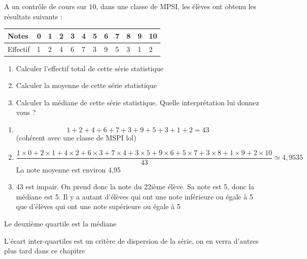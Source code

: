 \begin{exemple}
A un contrôle de cours sur $10$, dans une classe de MPSI, les élèves ont obtenu les résultats suivants :\newline

 
\begin{tabularx}{\linewidth}{|X|X|X|X|X|X|X|X|X|X|X|X|}
\hline
Notes & 0 & 1 & 2 & 3 & 4 & 5 & 6 & 7 & 8 & 9 & 10\\ \hline
Effectif & 1 & 2 & 4 & 6 & 7 & 3 & 9 & 5 & 3 & 1 & 2\\ \hline
\end{tabularx} 
\begin{enumerate}
\item Calculer l'effectif total de cette série statistique
\item Calculer la moyenne de cette série statistique
\item Calculer la médiane de cette série statistique. Quelle interprétation lui donnez vous ?
\end{enumerate}
\begin{enumerate}
\item $$1 + 2 + 4 + 6 + 7 + 3 + 9 + 5 + 3 + 1 + 2 = 43$$ (cohérent avec une classe de MSPI lol)
\item $$\dfrac{1\times 0 + 2 \times 1 + 4 \times 2 + 6 \times 3 + 7 \times 4 + 3 \times 5 + 9 \times 6 +5 \times 7 + 3 \times 8 + 1 \times 9 + 2 \times 10}{43} \simeq 4,9535$$ La note moyenne est environ 4,95
\item 43 est impair. On prend donc la note du 22ième élève. Sa note est 5, donc la médiane est 5. Il y a autant d'élèves qui ont une note inférieure ou égale à 5 que d'élèves qui ont une note supérieure ou égale à 5
\end{enumerate}
\end{exemple}

\newline

Le deuxième quartile est la médiane\newline

\newline L'écart inter-quartiles est un critère de dispersion de la série, on en verra d'autres plus tard dans ce chapitre\newline

